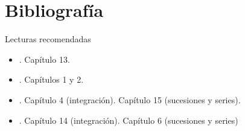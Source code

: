 \documentclass[9pt, aspectratio=169]{beamer}
\begin{document}
\section*{Bibliografía}
\begin{frame}[allowframebreaks]{Lecturas recomendadas}
\begin{itemize}
 \item {}. Capítulo 13.
 \item {}. Capítulos 1 y 2.
 \item {}. Capítulo 4 (integración). Capítulo 15 (sucesiones y series).
 \item {}. Capítulo 14 (integración). Capítulo 6 (sucesiones y series)
\end{itemize}
\end{frame}
\end{document}
